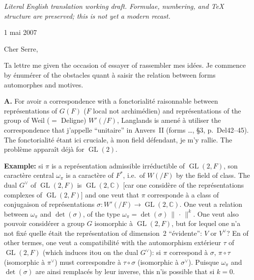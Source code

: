 \documentclass[11pt,a4paper]{article}
\theoremstyle{plain}
\theoremstyle{definition}
\DeclareMathOperator{\GL}{GL}
\newcommand{\norm}[1]{\lVert#1\rVert}
\begin{document}
\begin{center}\small\emph{Literal English translation working draft. Formulae, numbering, and TeX structure are preserved; this is not yet a modern recast.}\end{center}
\vspace{0.5em}


\begin{flushright}
1 mai 2007
\end{flushright}

\medskip
\noindent Cher Serre,

\smallskip
Ta lettre me given the occasion of essayer of rassembler mes id\'{e}es. Je commence by
\'{e}num\'{e}rer of the obstacles quant \`{a} saisir the relation between forms automorphes and motives.

\bigskip
\noindent \textbf{A.} For avoir a correspondence with a fonctorialit\'{e} raisonnable between repr\'{e}sentations of
$G(F)$ ($F$ local not archim\'{e}dien) and repr\'{e}sentations of the group of Weil ($=$ Deligne) $W'(/F)$,
Langlands is amen\'{e} \`{a} utiliser the correspondence that j'appelle ``unitaire'' in Anvers~II
(forms \ldots, \S3, p.~Del42--45). The fonctorialit\'{e} \'{e}tant ici cruciale, \`{a} mon field d\'{e}fendant, je
m'y rallie. The probl\`{e}me appara\^{i}t d\'{e}j\`{a} for $\GL(2)$.

\smallskip
\textbf{Example:} si $\pi$ is a repr\'{e}sentation admissible irr\'{e}ductible of $\GL(2,F)$, son caract\`{e}re central $\omega_\pi$ is a caract\`{e}re of $F^*$, i.e.~of $W(/F)$ by the field of class. The dual $G^\vee$ of $\GL(2,F)$ is $\GL(2,\mathbb C)$ [car one consid\`{e}re of the repr\'{e}sentations complexes of $\GL(2,F)$] and one veut that $\pi$ corresponde \`{a} a class of conjugaison of repr\'{e}sentations $\sigma \colon W'(/F) \to \GL(2,\mathbb C)$. One veut a relation between $\omega_\pi$ and $\det(\sigma)$, of the type $\omega_\pi = \det(\sigma)\,\norm{\,\cdot\,}^k$. One veut also pouvoir consid\'{e}rer a group $G$ isomorphic \`{a} $\GL(2,F)$, but for lequel one n'a not fix\'{e} quelle \'{e}tait the repr\'{e}sentation of dimension~2 ``\'{e}vidente'': $V$ or $V^\vee$? En of other termes, one veut a compatibilit\'{e} with the automorphism ext\'{e}rieur $\tau$ of $\GL(2,F)$ (which induces itou on the dual $G^\vee$): si $\pi$ correspond \`{a} $\sigma$, $\pi \circ \tau$ (isomorphic \`{a} $\pi^\vee$) must correspondre \`{a} $\tau \circ \sigma$ (isomorphic \`{a} $\sigma^\vee$). Puisque $\omega_\pi$ and $\det(\sigma)$ are ainsi remplac\'{e}s by leur inverse, this n'is possible that si $k=0$.
\end{document}
